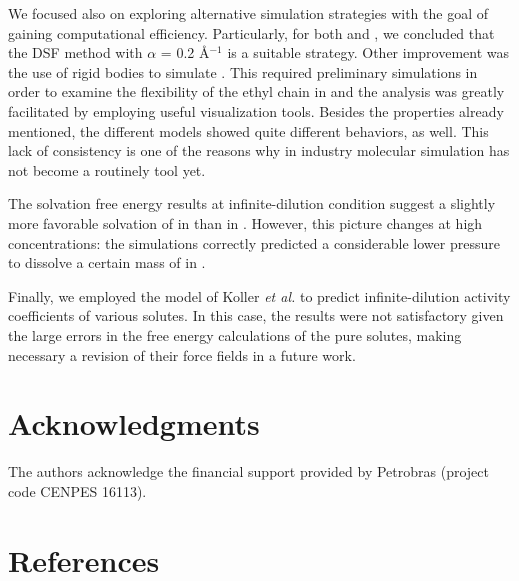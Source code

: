 \documentclass[3p,twocolumn]{elsarticle}
\begin{document}
We focused also on exploring alternative simulation strategies with the goal of gaining computational efficiency.
Particularly, for both \ce{[emim][B(CN)_4]} and \ce{[emim][NTf_2]}, we concluded that the DSF method with $\alpha$ = 0.2 {\AA}$^{-1}$ is a suitable strategy.
Other improvement was the use of rigid bodies to simulate \ce{[emim][B(CN)_4]}.
This required preliminary simulations in order to examine the flexibility of the ethyl chain in \ce{[emim]^+} and the analysis was greatly facilitated by employing useful visualization tools.
Besides the properties already mentioned, the different models showed quite different behaviors, as well.
This lack of consistency is one of the reasons why in industry molecular simulation has not become a routinely tool yet.

The solvation free energy results at infinite-dilution condition suggest a slightly more favorable solvation of  in \ce{[emim][B(CN)_4]} than in  \ce{[emim][NTf_2]}.
However, this picture changes at high concentrations: the simulations correctly predicted a considerable lower pressure to dissolve a certain mass of  in \ce{[emim][B(CN)_4]}.

Finally, we employed the model of Koller \textit{et al.} \cite{Koller_2012} to predict infinite-dilution activity coefficients of various solutes.
In this case, the results were not satisfactory given the large errors in the free energy calculations of the pure solutes, making necessary a revision of their force fields in a future work.

\section*{Acknowledgments}
The authors acknowledge the financial support provided by Petrobras (project code CENPES 16113). 

\section*{References}


\end{document}
